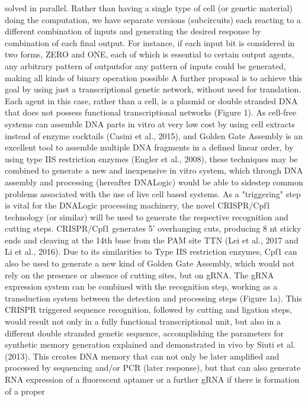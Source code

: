 solved in parallel. Rather than having a single type of cell (or genetic material) doing the computation, we
have separate versions (subcircuits) each reacting to a different combination of inputs and generating the
desired response by combination of each final output. For instance, if each input bit is considered in two
forms, ZERO and ONE, each of which is essential to certain output agents, any arbitrary pattern of outputsfor any pattern of inputs could be generated, making all kinds of binary operation possible
A further proposal is to achieve this goal by using just a transcriptional genetic network, without need for
translation. Each agent in this case, rather than a cell, is a plasmid or double stranded DNA that does not
possess functional transcriptional networks (Figure 1). As cell-free systems can assemble DNA parts in vitro
at very low cost by using cell extracts instead of enzyme cocktails (Casini et al., 2015), and Golden Gate
Assembly is an excellent tool to assemble multiple DNA fragments in a defined linear order, by using type
IIS restriction enzymes (Engler et al., 2008), these techniques may be combined to generate a new and
inexpensive in vitro system, which through DNA assembly and processing (hereafter DNALogic) would be
able to sidestep common problems associated with the use of live cell based systems. As a "triggering" step
is vital for the DNALogic processing machinery, the novel CRISPR/Cpf1 technology (or similar) will be used
to generate the respective recognition and cutting steps. CRISPR/Cpf1 generates 5' overhanging cuts,
producing 8 nt sticky ends and cleaving at the 14th base from the PAM site TTN (Lei et al., 2017 and Li et al.,
2016). Due to its similarities to Type IIS restriction enzymes, Cpf1 can also be used to generate a new kind
of Golden Gate Assembly, which would not rely on the presence or absence of cutting sites, but on gRNA.
The gRNA expression system can be combined with the recognition step, working as a transduction system
between the detection and processing steps (Figure 1a).
This CRISPR triggered sequence recognition,
followed by cutting and ligation steps, would result not only in a fully functional transcriptional unit, but also in
a different double stranded genetic sequence, accomplishing the parameters for synthetic memory
generation explained and demonstrated in vivo by Siuti et al. (2013). This creates DNA memory that can not
only be later amplified and processed by sequencing and/or PCR (later response), but that can also
generate RNA expression of a fluorescent aptamer or a further gRNA if there is formation of a proper
